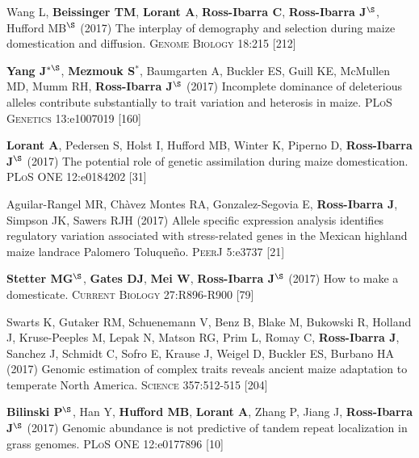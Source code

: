 \documentclass[letterpaper,10pt]{article}
\begin{document}
\begin{etaremune}
\item Wang L, \textbf{Beissinger TM}, \textbf{Lorant A}, \textbf{Ross-Ibarra C}, \textbf{Ross-Ibarra J}$^\S$, Hufford MB$^\S$ (2017) The interplay of demography and selection during maize domestication and diffusion. \textsc{Genome Biology} 18:215
 [212]\\

\item {\bf Yang J}$^{*\S}$, {\bf Mezmouk S}$^*$, Baumgarten A, Buckler ES, Guill KE, McMullen MD, Mumm RH, {\bf Ross-Ibarra J}$^\S$ (2017) Incomplete dominance of deleterious alleles contribute substantially to trait variation and heterosis in maize. \textsc{PLoS Genetics} 13:e1007019
 [160]\\

\item \textbf{Lorant A}, Pedersen S, Holst I, Hufford MB, Winter K, Piperno D, \textbf{Ross-Ibarra J}$^\S$ (2017) The potential role of genetic assimilation during maize domestication. \textsc{PLoS ONE} 12:e0184202
 [31]\\

\item Aguilar-Rangel MR, Ch\`{a}vez Montes RA,  Gonzalez-Segovia E, \textbf{Ross-Ibarra J}, Simpson JK, Sawers RJH (2017) Allele specific expression analysis identifies regulatory variation associated with stress-related genes in the Mexican highland maize landrace Palomero Toluque\~{n}o. \textsc{PeerJ} 5:e3737
 [21]\\

\item   {\bf Stetter MG}$^\S$, {\bf Gates DJ}, {\bf Mei W}, {\bf Ross-Ibarra J}$^\S$ (2017) How to make a domesticate. \textsc{Current Biology} 27:R896-R900
 [79]\\

\item Swarts K, Gutaker RM,   Schuenemann V,  Benz B,  Blake M, Bukowski R, Holland J, Kruse-Peeples M, Lepak N, Matson RG, Prim L, Romay C, {\bf Ross-Ibarra J}, Sanchez J, Schmidt C,  Sofro E,  Krause J,  Weigel D,  Buckler ES,  Burbano HA (2017) Genomic estimation of complex traits reveals ancient maize adaptation to temperate North America. \textsc{Science} 357:512-515
 [204]\\

\item {\bf Bilinski P}$^\S$, Han Y, {\bf Hufford MB}, {\bf Lorant A}, Zhang P, Jiang J, {\bf Ross-Ibarra J}$^\S$ (2017) Genomic abundance is not predictive of tandem repeat localization in grass genomes. \textsc{PLoS ONE} 12:e0177896
 [10]\\


\end{etaremune}
\end{document}
